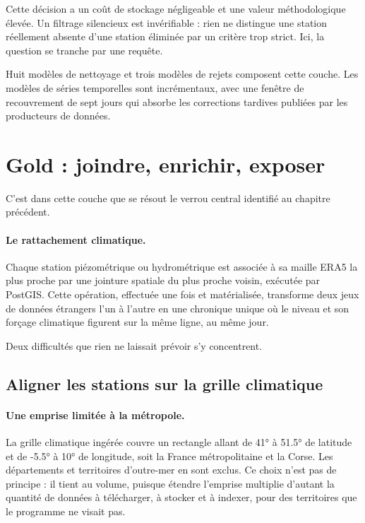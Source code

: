 Cette décision a un coût de stockage négligeable et une valeur méthodologique élevée. Un
filtrage silencieux est invérifiable : rien ne distingue une station réellement absente d'une
station éliminée par un critère trop strict. Ici, la question se tranche par une requête.

Huit modèles de nettoyage et trois modèles de rejets composent cette couche. Les modèles de
séries temporelles sont incrémentaux, avec une fenêtre de recouvrement de sept jours qui absorbe
les corrections tardives publiées par les producteurs de données.

\section{Gold : joindre, enrichir, exposer}

C'est dans cette couche que se résout le verrou central identifié au chapitre précédent.

\paragraph{Le rattachement climatique.} Chaque station piézométrique ou hydrométrique est
associée à sa maille ERA5 la plus proche par une jointure spatiale du plus proche voisin,
exécutée par PostGIS. Cette opération, effectuée
une fois et matérialisée, transforme deux jeux de données étrangers l'un à l'autre en une
chronique unique où le niveau et son forçage climatique figurent sur la même ligne, au même
jour.

Deux difficultés que rien ne laissait prévoir s'y concentrent.

\subsection{Aligner les stations sur la grille climatique}

\paragraph{Une emprise limitée à la métropole.} La grille climatique ingérée couvre un rectangle
allant de \ang{41} à \ang{51.5} de latitude et de \ang{-5.5} à \ang{10} de longitude, soit la
France métropolitaine et la Corse. Les départements et territoires d'outre-mer en sont exclus.
Ce choix n'est pas de principe : il tient au volume, puisque étendre l'emprise multiplie d'autant
la quantité de données à télécharger, à stocker et à indexer, pour des territoires que le
programme ne visait pas.

